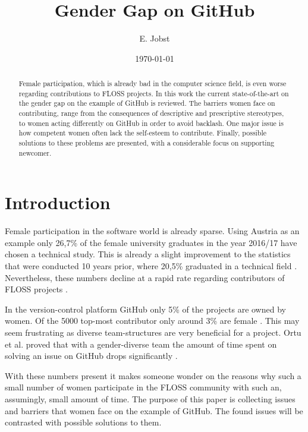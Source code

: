 \documentclass[a4paper, 11pt]{article}
\title{Gender Gap on GitHub}
\begin{document}
\date{\today}
\author{E. Jobst}
\maketitle

\begin{abstract}
Female participation, which is already bad in the computer science field, is even worse regarding contributions to FLOSS projects. In this work the current state-of-the-art on the gender gap on the example of GitHub is reviewed. The barriers women face on contributing, range from the consequences of descriptive and prescriptive stereotypes, to women acting differently on GitHub in order to avoid backlash. One major issue is how competent women often lack the self-esteem to contribute. Finally, possible solutions to these problems are presented, with a considerable focus on supporting newcomer.
\end{abstract}

\section{Introduction} \label{sec:intro}
Female participation in the software world is already sparse. Using Austria as an example only 26,7\% of the female university graduates in the year 2016/17 have chosen a technical study. This is already a slight improvement to the statistics that were conducted 10 years prior, where 20,5\% graduated in a technical field \cite{education-austria}. Nevertheless, these numbers decline at a rapid rate regarding contributors of FLOSS projects \cite{competence-confidence-gap}. \newline

In the version-control platform GitHub only 5\% of the projects are owned by women. Of the 5000 top-most contributor only around 3\% are female \cite{competence-confidence-gap}. This may seem frustrating as diverse team-structures are very beneficial for a project. Ortu et al. proved that with a gender-diverse team the amount of time spent on solving an issue on GitHub drops significantly \cite{how-diverse-team}\cite{gender-tenure-diversity}. \newline

With these numbers present it makes someone wonder on the reasons why such a small number of women participate in the FLOSS community with such an, assumingly, small amount of time. The purpose of this paper is collecting issues and barriers that women face on the example of GitHub. The found issues will be contrasted with possible solutions to them.
\end{document}
